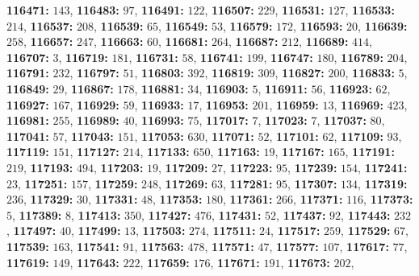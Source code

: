 \textsf{\bfseries 116471:} $143$, \textsf{\bfseries 116483:} $97$, \textsf{\bfseries 116491:} $122$, \textsf{\bfseries 116507:} $229$, \textsf{\bfseries 116531:} $127$, \textsf{\bfseries 116533:} $214$, \textsf{\bfseries 116537:} $208$, \textsf{\bfseries 116539:} $65$, \textsf{\bfseries 116549:} $53$, \textsf{\bfseries 116579:} $172$, \textsf{\bfseries 116593:} $20$, \textsf{\bfseries 116639:} $258$, \textsf{\bfseries 116657:} $247$, \textsf{\bfseries 116663:} $60$, \textsf{\bfseries 116681:} $264$, \textsf{\bfseries 116687:} $212$, \textsf{\bfseries 116689:} $414$, \textsf{\bfseries 116707:} $3$, \textsf{\bfseries 116719:} $181$, \textsf{\bfseries 116731:} $58$, \textsf{\bfseries 116741:} $199$, \textsf{\bfseries 116747:} $180$, \textsf{\bfseries 116789:} $204$, \textsf{\bfseries 116791:} $232$, \textsf{\bfseries 116797:} $51$, \textsf{\bfseries 116803:} $392$, \textsf{\bfseries 116819:} $309$, \textsf{\bfseries 116827:} $200$, \textsf{\bfseries 116833:} $5$, \textsf{\bfseries 116849:} $29$, \textsf{\bfseries 116867:} $178$, \textsf{\bfseries 116881:} $34$, \textsf{\bfseries 116903:} $5$, \textsf{\bfseries 116911:} $56$, \textsf{\bfseries 116923:} $62$, \textsf{\bfseries 116927:} $167$, \textsf{\bfseries 116929:} $59$, \textsf{\bfseries 116933:} $17$, \textsf{\bfseries 116953:} $201$, \textsf{\bfseries 116959:} $13$, \textsf{\bfseries 116969:} $423$, \textsf{\bfseries 116981:} $255$, \textsf{\bfseries 116989:} $40$, \textsf{\bfseries 116993:} $75$, \textsf{\bfseries 117017:} $7$, \textsf{\bfseries 117023:} $7$, \textsf{\bfseries 117037:} $80$, \textsf{\bfseries 117041:} $57$, \textsf{\bfseries 117043:} $151$, \textsf{\bfseries 117053:} $630$, \textsf{\bfseries 117071:} $52$, \textsf{\bfseries 117101:} $62$, \textsf{\bfseries 117109:} $93$, \textsf{\bfseries 117119:} $151$, \textsf{\bfseries 117127:} $214$, \textsf{\bfseries 117133:} $650$, \textsf{\bfseries 117163:} $19$, \textsf{\bfseries 117167:} $165$, \textsf{\bfseries 117191:} $219$, \textsf{\bfseries 117193:} $494$, \textsf{\bfseries 117203:} $19$, \textsf{\bfseries 117209:} $27$, \textsf{\bfseries 117223:} $95$, \textsf{\bfseries 117239:} $154$, \textsf{\bfseries 117241:} $23$, \textsf{\bfseries 117251:} $157$, \textsf{\bfseries 117259:} $248$, \textsf{\bfseries 117269:} $63$, \textsf{\bfseries 117281:} $95$, \textsf{\bfseries 117307:} $134$, \textsf{\bfseries 117319:} $236$, \textsf{\bfseries 117329:} $30$, \textsf{\bfseries 117331:} $48$, \textsf{\bfseries 117353:} $180$, \textsf{\bfseries 117361:} $266$, \textsf{\bfseries 117371:} $116$, \textsf{\bfseries 117373:} $5$, \textsf{\bfseries 117389:} $8$, \textsf{\bfseries 117413:} $350$, \textsf{\bfseries 117427:} $476$, \textsf{\bfseries 117431:} $52$, \textsf{\bfseries 117437:} $92$, \textsf{\bfseries 117443:} $232$, \textsf{\bfseries 117497:} $40$, \textsf{\bfseries 117499:} $13$, \textsf{\bfseries 117503:} $274$, \textsf{\bfseries 117511:} $24$, \textsf{\bfseries 117517:} $259$, \textsf{\bfseries 117529:} $67$, \textsf{\bfseries 117539:} $163$, \textsf{\bfseries 117541:} $91$, \textsf{\bfseries 117563:} $478$, \textsf{\bfseries 117571:} $47$, \textsf{\bfseries 117577:} $107$, \textsf{\bfseries 117617:} $77$, \textsf{\bfseries 117619:} $149$, \textsf{\bfseries 117643:} $222$, \textsf{\bfseries 117659:} $176$, \textsf{\bfseries 117671:} $191$, \textsf{\bfseries 117673:} $202$, 

